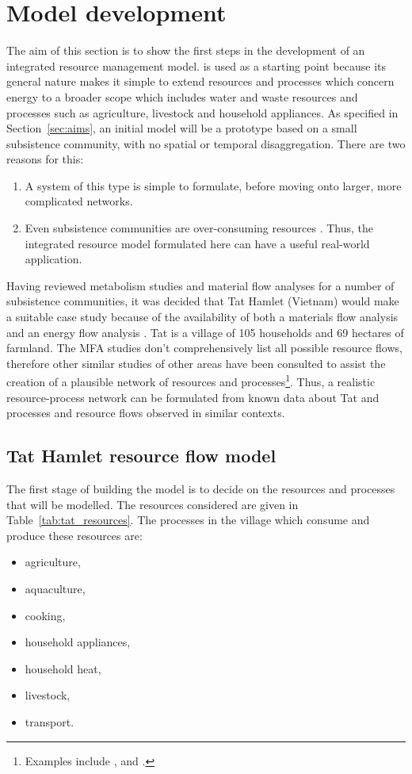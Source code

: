 \section{Model development} \label{sec:models}
The aim of this section is to show the first steps in the development of an integrated resource management model. \citet{Samsatli} is used as a starting point because its general nature makes it simple to extend resources and processes which concern energy to a broader scope which includes water and waste resources and processes such as agriculture, livestock and household appliances. As specified in Section~\ref{sec:aims}, an initial model will be a prototype based on a small subsistence community, with no spatial or temporal disaggregation. There are two reasons for this: 
\begin{enumerate}
	\item A system of this type is simple to formulate, before moving onto larger, more complicated networks.
	\item Even subsistence communities are over-consuming resources \citep{Hobbes2005, Hobbes2007, Shandl2006, Haberl2002}. Thus, the integrated resource model formulated here can have a useful real-world application.
\end{enumerate}

Having reviewed metabolism studies and material flow analyses for a number of subsistence communities, it was decided that Tat Hamlet (Vietnam) would make a suitable case study because of the availability of both a materials flow analysis \citep{Hobbes2007, Shandl2006} and an energy flow analysis \citep{Heezen2003}. Tat is a village of 105 households and 69 hectares of farmland. The MFA studies don't comprehensively list all possible resource flows, therefore other similar studies of other areas have been consulted to assist the creation of a plausible network of resources and processes\footnote{Examples include \citet{Alam1997}, \citet{Alam1999} and \citet{Tripathi2001}.}. Thus, a realistic resource-process network can be formulated from known data about Tat and processes and resource flows observed in similar contexts. 

\subsection{Tat Hamlet resource flow model}
The first stage of building the model is to decide on the resources and processes that will be modelled. The resources considered are given in Table~\ref{tab:tat_resources}. The processes in the village which consume and produce these resources are:
\begin{itemize}
	\item agriculture,
	\item aquaculture,
	\item cooking,
	\item household appliances,
	\item household heat,
	\item livestock,
	\item transport.
\end{itemize}

